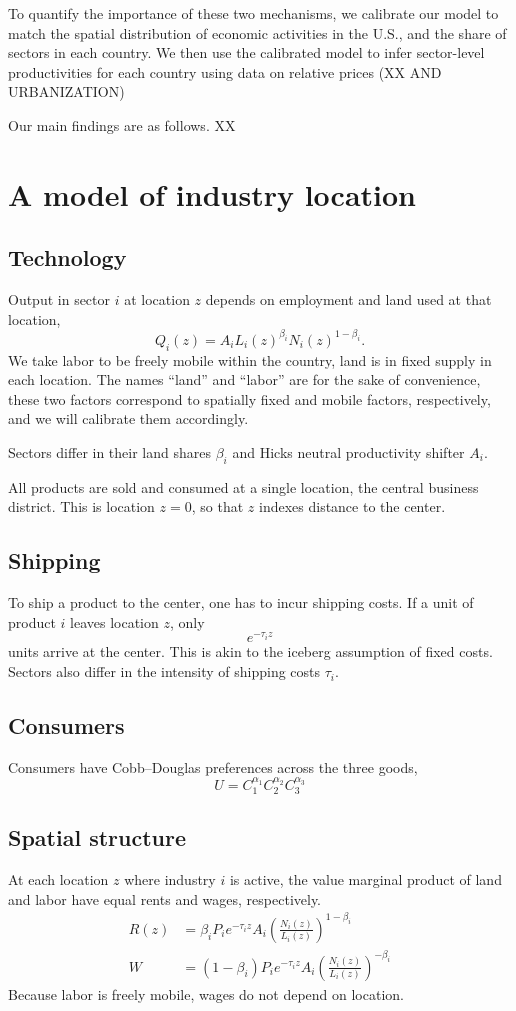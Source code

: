 \documentclass[12pt]{article}
\begin{document}
To quantify the importance of these two mechanisms, we calibrate our model to match the spatial distribution of economic activities in the U.S., and the share of sectors in each country. We then use the calibrated model to infer sector-level productivities for each country using data on relative prices (XX AND URBANIZATION)

Our main findings are as follows. XX


\section{A model of industry location}
\subsection{Technology}
Output in sector $i$ at location $z$ depends on employment and land used at that location,
\[
Q_i(z) = A_i L_i(z)^{\beta_i}N_i(z)^{1-\beta_i}.
\]
We take labor to be freely mobile within the country, land is in fixed supply in each location. The names ``land'' and ``labor'' are for the sake of convenience, these two factors correspond to spatially fixed and mobile factors, respectively, and we will calibrate them accordingly.

Sectors differ in their land shares $\beta_i$ and Hicks neutral productivity shifter $A_i$.

All products are sold and consumed at a single location, the central business district. This is location $z=0$, so that $z$ indexes distance to the center.

\subsection{Shipping}
To ship a product to the center, one has to incur shipping costs. If a unit of product $i$ leaves location $z$, only
\[
e^{-\tau_i z}
\]
units arrive at the center. This is akin to the iceberg assumption of fixed costs. Sectors also differ in the intensity of shipping costs $\tau_i$.

\subsection{Consumers}
Consumers have Cobb--Douglas preferences across the three goods,
\[
U = C_1^{\alpha_1}C_2^{\alpha_2}C_3^{\alpha_3}
\]


\subsection{Spatial structure}
At each location $z$ where industry $i$ is active, the value marginal product of land and labor have equal rents and wages, respectively.
\begin{align}
R(z) &=\beta_i P_ie^{-\tau_i z}A_i \left(\frac{N_i(z)}{L_i(z)}\right)^{1-\beta_i}\\
W &=(1-\beta_i) P_ie^{-\tau_i z}A_i \left(\frac{N_i(z)}{L_i(z)}\right)^{-\beta_i}
\end{align}
Because labor is freely mobile, wages do not depend on location.
\end{document}
